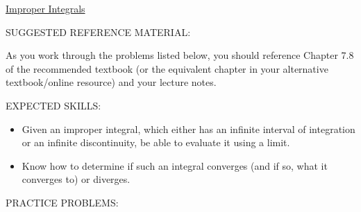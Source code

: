 \documentclass[12pt]{article}
\begin{document}
\begin{center}
\underline{\LARGE{Improper Integrals}}
\end{center}

\noindent SUGGESTED REFERENCE MATERIAL:

\bigskip

\noindent As you work through the problems listed below, you should reference Chapter 7.8 of the recommended textbook (or the equivalent chapter in your alternative textbook/online resource) and your lecture notes.

\bigskip

\noindent EXPECTED SKILLS:

\begin{itemize}

\item Given an improper integral, which either has an infinite interval of integration or an infinite discontinuity, be able to evaluate it using a limit. 

\item Know how to determine if such an integral converges (and if so, what it converges to) or diverges.

\end{itemize}

\noindent PRACTICE PROBLEMS:

\medskip

\end{document}
